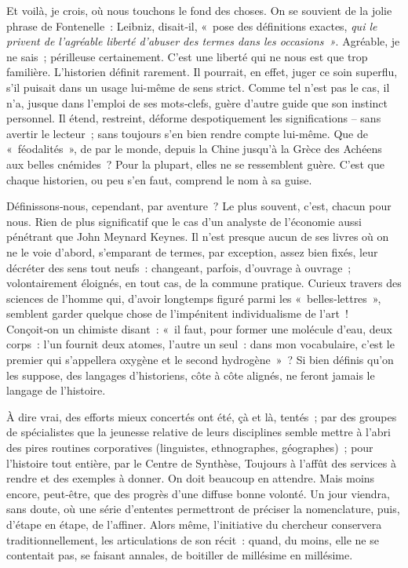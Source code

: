 \documentclass[french,twoside]{book} %
\begin{document}
\noindent Et voilà, je crois, où nous touchons le fond des choses. On se souvient de la jolie phrase de Fontenelle : Leibniz, disait‑il, « pose des définitions exactes, \emph{qui le privent de l’agréable liberté d’abuser des termes dans les occasions »}. Agréable, je ne sais ; périlleuse certainement. C’est une liberté qui ne nous est que trop familière. L’historien définit rarement. Il pourrait, en effet, juger ce soin superflu, s’il puisait dans un usage lui-même de sens strict. Comme tel n’est pas le cas, il n’a, jusque dans l’emploi de ses mots‑clefs, guère d’autre guide que son instinct personnel. Il étend, restreint, déforme despotiquement les significations – sans avertir le lecteur ; sans toujours s’en bien rendre compte lui-même. Que de « féoda­lités », de par le monde, depuis la Chine jusqu’à la Grèce des Achéens aux belles cnémides ? Pour la plupart, elles ne se ressemblent guère. C’est que chaque historien, ou peu s’en faut, comprend le nom à sa guise.\par
Définissons‑nous, cependant, par aventure ? Le plus souvent, c’est, chacun pour nous. Rien de plus significatif que le cas d’un analyste de l’économie aussi pénétrant que John Meynard Keynes. Il n’est presque aucun de ses livres où on ne le voie d’abord, s’emparant de termes, par exception, assez bien fixés, leur décréter des sens tout neufs : changeant, parfois, d’ouvrage à ouvrage ; volontairement éloignés, en tout cas, de la commune pratique. Curieux travers des sciences de l’homme qui, d’avoir longtemps figuré parmi les « belles‑lettres », semblent garder quelque chose de l’impénitent individualisme de l’art ! Conçoit‑on un chimiste disant : « il faut, pour former une molécule d’eau, deux corps : l’un fournit deux atomes, l’autre un seul : dans mon vocabulaire, c’est le premier qui s’appellera oxygène et le second hydrogène » ? Si bien définis qu’on les suppose, des langages d’historiens, côte à côte alignés, ne feront jamais le langage de l’histoire.\par
\label{p90} À dire vrai, des efforts mieux concertés ont été, çà et là, tentés ; par des groupes de spécialistes que la jeunesse relative de leurs disciplines semble mettre à l’abri des pires routines corporatives (linguistes, ethno­graphes, géographes) ; pour l’histoire tout entière, par le Centre de Syn­thèse, Toujours à l’affût des services à rendre et des exemples à donner. On doit beaucoup en attendre. Mais moins encore, peut‑être, que des progrès d’une diffuse bonne volonté. Un jour viendra, sans doute, où une série d’ententes permettront de préciser la nomenclature, puis, d’étape en étape, de l’affiner. Alors même, l’initiative du chercheur conservera traditionnellement, les articulations de son récit : quand, du moins, elle ne se contentait pas, se faisant annales, de boitiller de millésime en millé­sime.\par
\end{document}
